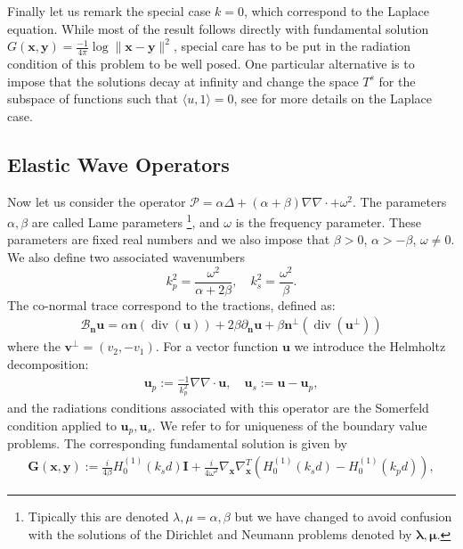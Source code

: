 \documentclass{article}
\renewcommand{\div}{\operatorname{div}}
\newcommand{\bmu} {\bm{\mu}}
\renewcommand{\div}{{\rm div}}
\renewcommand{\div}{\operatorname{div}}
\newcommand{\cP}{\mathcal{P}}
\newcommand{\bla}{\boldsymbol \lambda}
\newcommand{\bn}{\bm{n}}
\newcommand{\bu}{\bm{u}}
\newcommand{\bx}{\bm{x}}
\newcommand{\by}{\bm{y}}
\begin{document}
Finally let us remark the special case $k=0$, which correspond to the Laplace equation. While most of the result follows directly with fundamental solution $G(\bx,\by) = \frac{-1}{4\pi} \log \| \bx - \by \|^2$, special care has to be put in the radiation condition of this problem to be well posed. One particular alternative is to impose that the solutions decay at infinity and change the space $T^s$ for the subspace of functions such that $\langle u, 1 \rangle = 0$, see \cite{stephan1984augmented,JHP20} for more details on the Laplace case. 
\subsection{Elastic Wave Operators}

Now let us consider the operator $\cP = \alpha \Delta + (\alpha + \beta) \nabla \nabla \cdot + \omega^2$. The parameters $\alpha,\beta$ are called Lame parameters \footnote{Tipically this are denoted $\lambda, \mu = \alpha, \beta$ but we have changed to avoid confusion with the solutions of the Dirichlet and Neumann problems denoted by $\bla, \bmu$.}, and $\omega$ is the frequency parameter. These parameters are  fixed real numbers and we also impose that  $\beta > 0$, $\alpha > - \beta$, $\omega \neq 0$. We also define two associated wavenumbers $$
k_p^2 = \frac{\omega^2}{\alpha+2\beta}, \quad
k_s^2 = \frac{\omega^2}{\beta}.$$  
The co-normal trace correspond to the tractions, defined as: 
\begin{align*}
\mathcal{B}_{\bn} \mathbf{u} =
\alpha \mathbf{n} (\div(\mathbf{u}))
+ 2 \beta \partial_{\mathbf{n}} \mathbf{u}+
\beta  \mathbf{n}^\perp (\div(\mathbf{u}^\perp))
\end{align*}
where the $\mathbf{v}^\perp  = (v_2,-v_1)$. For a vector function $\bu$ we introduce the Helmholtz decomposition: 
\begin{align*}
\mathbf{u}_p := \frac{-1}{k^2_p}\nabla \nabla \cdot \mathbf{u}, \quad
\mathbf{u}_s := \mathbf{u} - \mathbf{u}_p,
\end{align*} 
and the radiations conditions associated with this operator are the Somerfeld condition applied to $\bu_p, \bu_s$. We refer to \cite{kress1996} for uniqueness of the boundary value problems. 
The corresponding fundamental solution is given by 
\begin{align}
\label{eq:efunsol}
\mathbf{G} (\mathbf{x}, \mathbf{y}) := 
\frac{i}{4 \beta} H^{(1)}_0(k_s d)\mathbf{I}+ \frac{i}{4\omega^2} \nabla_\mathbf{x} 
\nabla_\mathbf{x} ^T \left( 
H^{(1)}_0(k_sd ) - H^{(1)}_0(k_p d)
\right),
\end{align}
\end{document}
